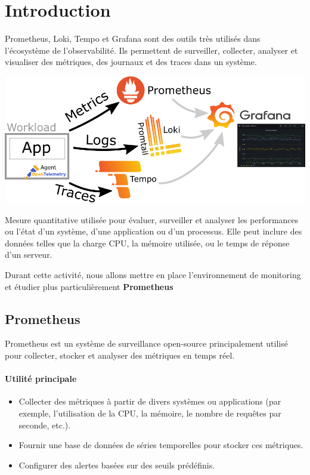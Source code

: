\documentclass[french, 12pt]{article}%
\newcommand{\itemE}{\item[$\bullet$]}
\newcommand{\titreencadre}{Titre}
\newenvironment{encadre}[1]{\renewcommand{\titreencadre}{#1}
	\begin{mdframed}[style=encadrestyle]
	\vspace{0.5\baselineskip}
	}{%
	\end{mdframed}}
\begin{document}
\tableofcontents
\newpage


\section{Introduction}
Prometheus, Loki, Tempo et Grafana sont des outils très utilisés dans l'écosystème de l'observabilité. Ils permettent de surveiller, collecter, analyser et visualiser des métriques, des journaux et des traces dans un système. 

\begin{center}
\includegraphics[scale=0.4]{./ressource/stackMonitoring}
\end{center}

\vspace{0.5cm}

\begin{encadre}{Métrique}
Mesure quantitative utilisée pour évaluer, surveiller et analyser les performances ou l'état d'un système, d'une application ou d'un processus. Elle peut inclure des données telles que la charge CPU, la mémoire utilisée, ou le temps de réponse d'un serveur.
\end{encadre}


Durant cette activité, nous allons mettre en place l'environnement de monitoring et étudier plus particulièrement \textbf{Prometheus} 

\subsection{Prometheus }
Prometheus est un système de surveillance open-source principalement utilisé pour collecter, stocker et analyser des métriques en temps réel.

\paragraph{Utilité principale}
\begin{itemize}
    \itemE Collecter des métriques à partir de divers systèmes ou applications (par exemple, l'utilisation de la CPU, la mémoire, le nombre de requêtes par seconde, etc.).
    \itemE Fournir une base de données de séries temporelles pour stocker ces métriques.
    \itemE Configurer des alertes basées sur des seuils prédéfinis.
\end{itemize}
\end{document}
